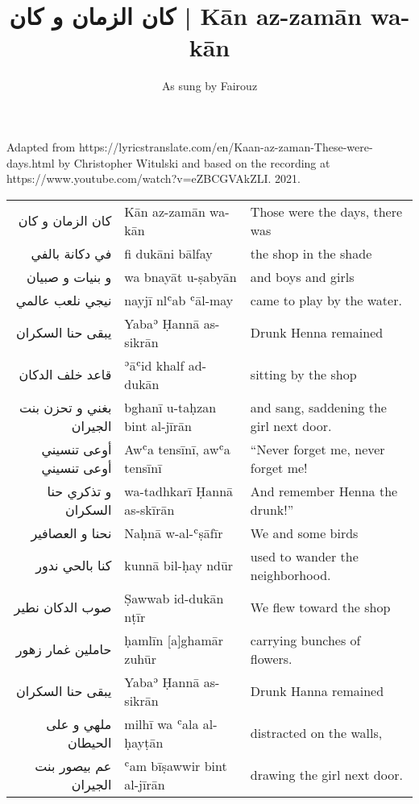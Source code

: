 \documentclass{article}
\title{\textarabic{كان الزمان و كان} | Kān az-zamān wa-kān}
\author{As sung by Fairouz}
\date{}
\begin{document}
\maketitle

\noindent
Adapted from https://lyricstranslate.com/en/Kaan-az-zaman-These-were-days.html by Christopher Witulski and based on the recording at https://www.youtube.com/watch?v=eZBCGVAkZLI. 2021.

\begin{center}
\begin{tabular}{ r l l }
\textarabic{كان الزمان و كان}         & Kān az-zamān wa-kān           & Those were the days, there was \\
\textarabic{في دكانة بالفي}           & fi dukāni bālfay              & the shop in the shade \\
\textarabic{و بنيات و صبيان}          & wa bnayāt u-ṣabyān            & and boys and girls \\
\textarabic{نيجي نلعب عالمي}          & nayjī nlʿab ʿāl-may           & came to play by the water. \\
\textarabic{يبقى حنا السكران}         & Yabaʾ Ḥannā as-sikrān         & Drunk Henna remained \\
\textarabic{قاعد خلف الدكان}          & ʾāʿid khalf ad-dukān          & sitting by the shop \\
\textarabic{بغني و تحزن بنت الجيران}  & bghanī u-taḥzan bint al-jīrān & and sang, saddening the girl next door. \\[0.5cm]

\textarabic{أوعى تنسيني أوعى تنسيني}  & Awʿa tensīnī, awʿa tensīnī    & ``Never forget me, never forget me! \\
\textarabic{و تذكري حنا السكران}      & wa-tadhkarī Ḥannā as-skīrān   & And remember Henna the drunk!'' \\[0.5cm]

\textarabic{نحنا و العصافير}          & Naḥnā w-al-ʿṣāfīr             & We and some birds \\
\textarabic{كنا بالحي ندور}           & kunnā bil-ḥay ndūr            & used to wander the neighborhood. \\
\textarabic{صوب الدكان نطير}          & Ṣawwab id-dukān nṭīr          & We flew toward the shop \\
\textarabic{حاملين غمار زهور}         & ḥamlīn [a]ghamār zuhūr        & carrying bunches of flowers. \\ 
\textarabic{يبقى حنا السكران}         & Yabaʾ Ḥannā as-sikrān         & Drunk Hanna remained \\
\textarabic{ملهي و على الحيطان}       & milhī wa ʿala al-ḥayṭān       & distracted on the walls, \\ 
\textarabic{عم بيصور بنت الجيران}     & ʿam bīṣawwir bint al-jīrān    & drawing the girl next door. \\[0.5cm]


\end{tabular}
\end{center}
\end{document}
